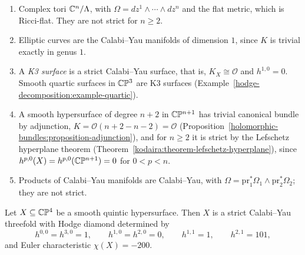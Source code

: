 \begin{example}\label{calabi-yau:example-calabi-yau}
\begin{enumerate}
\item Complex tori $\mathbb{C}^n/\Lambda$, with $\Omega = dz^1 \wedge \cdots \wedge dz^n$ and the flat metric, which is Ricci-flat. They are not strict for $n \geq 2$.
\item Elliptic curves are the Calabi--Yau manifolds of dimension $1$, since $K$ is trivial exactly in genus $1$.
\item A \emph{K3 surface} is a strict Calabi--Yau surface, that is, $K_X \cong \mathcal{O}$ and $h^{1,0} = 0$. Smooth quartic surfaces in $\mathbb{C}\mathbb{P}^3$ are K3 surfaces
(Example~\ref{hodge-decomposition:example-quartic}).
\item A smooth hypersurface of degree $n + 2$ in $\mathbb{C}\mathbb{P}^{n+1}$ has trivial canonical bundle by adjunction, $K = \mathcal{O}(n + 2 - n - 2) = \mathcal{O}$
(Proposition~\ref{holomorphic-bundles:proposition-adjunction}), and for $n \geq 2$ it is strict by the Lefschetz hyperplane theorem
(Theorem~\ref{kodaira:theorem-lefschetz-hyperplane}), since $h^{p,0}(X) = h^{p,0}(\mathbb{C}\mathbb{P}^{n+1}) = 0$ for $0 < p < n$.
\item Products of Calabi--Yau manifolds are Calabi--Yau, with $\Omega = \mathrm{pr}_1^*\Omega_1 \wedge \mathrm{pr}_2^*\Omega_2$; they are not strict.
\end{enumerate}
\end{example}

\begin{proposition}\label{calabi-yau:proposition-quintic}
Let $X \subseteq \mathbb{C}\mathbb{P}^4$ be a smooth quintic hypersurface. Then $X$ is a strict Calabi--Yau threefold with Hodge diamond determined by
\[
h^{0,0} = h^{3,0} = 1, \qquad h^{1,0} = h^{2,0} = 0, \qquad h^{1,1} = 1, \qquad h^{2,1} = 101,
\]
and Euler characteristic $\chi(X) = -200$.
\end{proposition}

